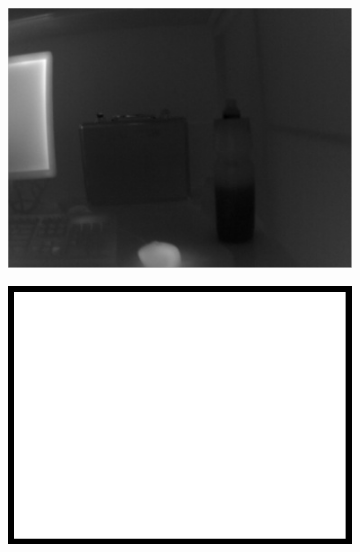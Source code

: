 \begin{figure}
\begin{subfigure}{0.49\columnwidth}
    \centering
    \includegraphics[width=1.00\textwidth]{media/V_C_highsnrgray.jpg}
    	\caption{}
		\label{fig:imgprocessing_3}
  \end{subfigure}
	\begin{subfigure}{0.49\columnwidth}
    \centering
    \includegraphics[width=1.00\textwidth]{media/dummy.jpg}
		\caption{}
		\label{fig:imgprocessing_4}
  \end{subfigure} \vspace{10pt} \\ 
	\begin{subfigure}{0.49\columnwidth}
    \centering

\end{subfigure}
\end{figure}
